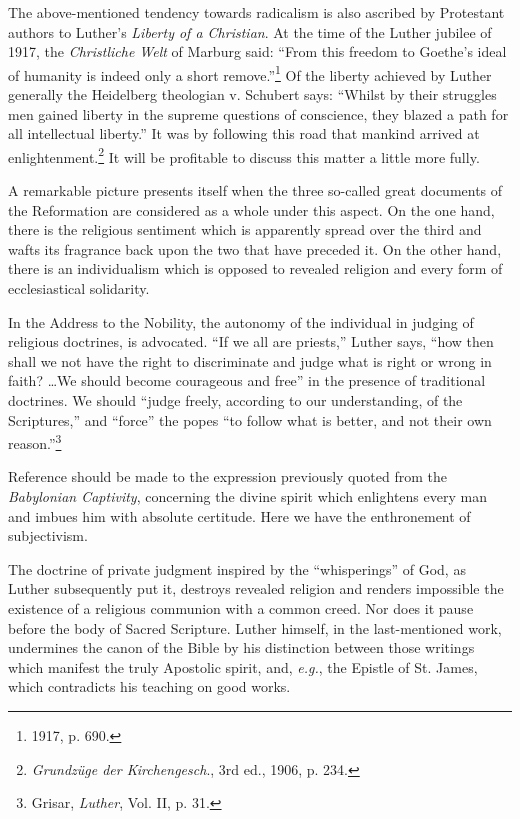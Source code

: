 The above-mentioned tendency towards radicalism is also ascribed
by Protestant authors to Luther’s \textit{Liberty of a Christian}. At the time
of the Luther jubilee of 1917, the \textit{Christliche Welt} of Marburg said:
“From this freedom to Goethe’s ideal of humanity is indeed only a
short remove.”\footnote{1917, p. 690.}
Of the liberty achieved by Luther generally the
Heidelberg theologian v. Schubert says: “Whilst by their struggles men
gained liberty in the supreme questions of conscience, they blazed
a path for all intellectual liberty.” It was by following this road that
mankind arrived at enlightenment.\footnote{\textit{Grundzüge der Kirchengesch}., 3rd ed., 1906, p. 234.}
It will be profitable to discuss this matter a little more fully.

A remarkable picture presents itself when the three so-called great
documents of the Reformation are considered as a whole under this
aspect. On the one hand, there is the religious sentiment which is
apparently spread over the third and wafts its fragrance back upon
the two that have preceded it. On the other hand, there is an individualism
which is opposed to revealed religion and every form of
ecclesiastical solidarity.

In the Address to the Nobility, the autonomy of the individual in judging
of religious doctrines, is advocated. “If we all are priests,” Luther says,
“how then shall we not have the right to discriminate and judge what is
right or wrong in faith? \dots We should become courageous and free” in
the presence of traditional doctrines. We should “judge freely, according to
our understanding, of the Scriptures,” and “force” the popes “to follow
what is better, and not their own reason.”\footnote{Grisar, \textit{Luther}, Vol. II, p. 31.}

Reference should be made to the expression previously quoted from the
\textit{Babylonian Captivity}, concerning the divine spirit which enlightens every
man and imbues him with absolute certitude. Here we have the enthronement
of subjectivism.

The doctrine of private judgment inspired by the “whisperings” of God,
as Luther subsequently put it, destroys revealed religion and renders impossible
the existence of a religious communion with a common creed. Nor
does it pause before the body of Sacred Scripture. Luther himself, in the
last-mentioned work, undermines the canon of the Bible by his distinction
between those writings which manifest the truly Apostolic spirit, and, \textit{e.g.},
the Epistle of St. James, which contradicts his teaching on good works.

